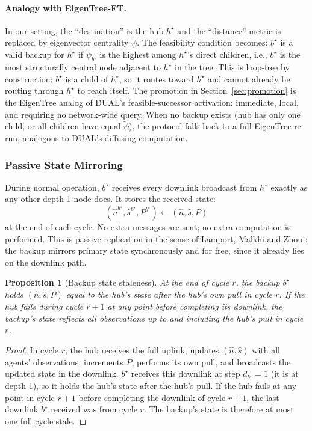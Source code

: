 \documentclass{article}
\newtheorem{proposition}{Proposition}
\newcommand{\merw}{EigenTree}
\newcommand{\merwft}{EigenTree-FT}
\begin{document}
\paragraph{Analogy with \merwft.} In our setting, the ``destination'' is the hub
$h^\star$ and the ``distance'' metric is replaced by eigenvector centrality $\tilde{\psi}$.
The feasibility condition becomes: $b^\star$ is a valid backup for $h^\star$ if
$\tilde{\psi}_{b^\star}$ is the highest among $h^\star$'s direct children, i.e.,
$b^\star$ is the most structurally central node adjacent to $h^\star$ in the tree. This
is loop-free by construction: $b^\star$ is a child of $h^\star$, so it routes toward
$h^\star$ and cannot already be routing through $h^\star$ to reach itself. The promotion
in Section~\ref{sec:promotion} is the \merw{} analog of DUAL's feasible-successor activation:
immediate, local, and requiring no network-wide query. When no backup exists (hub has
only one child, or all children have equal $\tilde{\psi}$), the protocol falls back to a
full \merw{} re-run, analogous to DUAL's diffusing computation.

\subsubsection{Passive State Mirroring}

During normal operation, $b^\star$ receives every downlink broadcast from $h^\star$
exactly as any other depth-1 node does. It stores the received state:
\[
    (\hat{n}^{b^\star}, \hat{s}^{b^\star}, P^{b^\star}) \leftarrow (\hat{n}, \hat{s}, P)
\]
at the end of each cycle. No extra messages are sent; no extra computation is performed.
This is passive replication in the sense of Lamport, Malkhi and Zhou
\citep{lamport2009vertical}: the backup mirrors primary state synchronously and for free,
since it already lies on the downlink path.

\begin{proposition}[Backup state staleness]
\label{prop:staleness}
    At the end of cycle $r$, the backup $b^\star$ holds $(\hat{n}, \hat{s}, P)$ equal to
    the hub's state after the hub's own pull in cycle $r$. If the hub fails during cycle
    $r+1$ at any point before completing its downlink, the backup's state reflects all
    observations up to and including the hub's pull in cycle $r$.
\end{proposition}

\begin{proof}
    In cycle $r$, the hub receives the full uplink, updates $(\hat{n}, \hat{s})$ with all
    agents' observations, increments $P$, performs its own pull, and broadcasts the
    updated state in the downlink. $b^\star$ receives this downlink at step $d_{b^\star} =
    1$ (it is at depth 1), so it holds the hub's state after the hub's pull. If the hub
    fails at any point in cycle $r+1$ before completing the downlink of cycle $r+1$,
    the last downlink $b^\star$ received was from cycle $r$. The backup's state is
    therefore at most one full cycle stale.
\end{proof}
\end{document}
